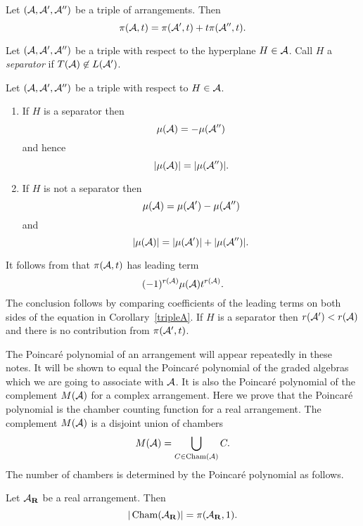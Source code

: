 \begin{cor}\label{tripleA}
Let $({\cal A},{\cal A}',{\cal A}'')$ be a triple of arrangements. Then
\[ \pi ({\cal A},t) = \pi ({\cal A}',t) + t \pi ({\cal A}'',t). \]
\end{cor}

\begin{defn}
Let $({\cal A},{\cal A}',{\cal A}'')$ be a triple with respect to
the hyperplane $H \in {\cal A}$. Call $H$ a {\em separator}
if $T({\cal A}) \not\in L({\cal A}')$.
\end{defn}

\begin{cor}\label{nsep}
Let $({\cal A},{\cal A}',{\cal A}'')$ be a triple with respect to $H \in {\cal A}$.
\begin{enumerate}
\renewcommand{\labelenumi}{(\roman{enumi})}
\item
If $H$ is a separator then
\[ \mu ({\cal A}) = - \mu ({\cal A}'') \]
and hence
\[ |\mu ({\cal A})| = | \mu ({\cal A}'')|. \]

\item If $H$ is not a separator then
\[\mu ({\cal A}) = \mu ({\cal A}') - \mu ({\cal A}'') \]
and
\[ |\mu ({\cal A})| = |\mu ({\cal A}')| + |\mu ({\cal A}'')|. \]
\end{enumerate}
\end{cor}

\begin{pf}
It follows from  that $\pi({\cal A},t)$
has leading term
\[(-1)^{r({\cal A})}\mu ({\cal A})t^{r({\cal A})}.\]
The conclusion
follows by comparing coefficients of the leading
terms on both sides of the equation in
Corollary~\ref{tripleA}. If $H$ is a separator then
$r({\cal A}') < r({\cal A})$ and there is no contribution
from $\pi ({\cal A}',t)$.
\end{pf}

The Poincar\'e polynomial of an arrangement
will appear repeatedly
in these notes. It will be shown to equal the
Poincar\'e polynomial
of the graded algebras which we are going to
associate with ${\cal A}$. It is also the Poincar\'e
polynomial of the complement $M({\cal A})$ for a
complex arrangement. Here we prove
that the Poincar\'e polynomial is the chamber
counting function for a real arrangement. The
complement $M({\cal A})$ is a disjoint union of chambers
\[M({\cal A}) = \bigcup_{C \in \operatorname{Cham}({\cal A})} C.\]
The number
of chambers is determined by the Poincar\'e
polynomial as follows.

\begin{thm}\label{th-realarr}
Let ${\cal A}_{\bold R}$ be a real arrangement. Then
\[ |\operatorname{Cham}({\cal A}_{\bold R})| = \pi ({\cal A}_{\bold R},1). \]
\end{thm}

